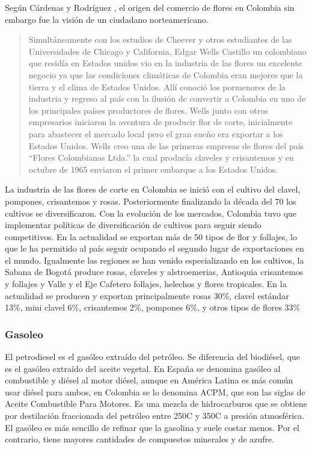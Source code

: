 Según Cárdenas y Rodríguez \cite{cardenasRodriguez}, el origen del comercio de flores en Colombia sin embargo fue la visión de un ciudadano norteamericano. 

\begin{quote}
Simultáneamente con los estudios de Cheever y otros estudiantes de las Universidades de Chicago y California, Edgar Wells Castillo un colombiano que residía en Estados unidos vio en la industria de las flores un excelente negocio ya que las condiciones climáticas de Colombia eran mejores que la tierra  y  el  clima de Estados Unidos. Allí conoció los pormenores de la industria y regreso al país con la ilusión de convertir a Colombia en uno de los principales países productores de flores. Wells junto con otros empresarios iniciaron la aventura de producir flor de corte, inicialmente para abastecer el mercado local pero el gran sueño era exportar a los Estados Unidos. Wells creo una de las primeras empresas de flores del país “Flores  Colombianas  Ltda.” la cual producía claveles y crisantemos y en octubre de 1965 enviaron el primer embarque a los Estados Unidos.
\end{quote}

La industria de las flores de corte en Colombia se inició con el cultivo del clavel, pompones, crisantemos y rosas. Posteriormente finalizando la década del  70 los cultivos se diversificaron. Con la evolución de los mercados, Colombia  tuvo que implementar políticas de diversificación de cultivos para seguir siendo  competitivos.  En  la  actualidad  se  exportan  más  de  50  tipos  de  flor  y  follajes,  lo  que  le  ha  permitido  al  país  seguir  ocupando el segundo lugar de exportaciones en el mundo. Igualmente  las  regiones  se  han  venido  especializando  en  los  cultivos, la Sabana de Bogotá produce rosas, claveles y alstroemerias, Antioquia crisantemos y follajes y Valle y el Eje Cafetero  follajes, helechos y flores tropicales. En la actualidad se producen y  exportan  principalmente rosas 30\%, clavel estándar 13\%, mini clavel 6\%, crisantemos 2\%, pompones 6\%, y otros tipos de flores 33\% \cite{cardenasRodriguez}

\subsubsection{Gasoleo}
El petrodiesel es el gasóleo extraído del petróleo. Se diferencia del biodiésel, que es el gasóleo extraído del aceite vegetal. En España se denomina gasóleo al combustible y diésel al motor diésel, aunque en América Latina es más común usar diésel para ambos, en Colombia se lo denomina ACPM, que son las siglas de Aceite Combustible Para Motores. Es una mezcla de hidrocarburos que se obtiene por destilación fraccionada del petróleo entre 250C y 350C a presión atmosférica. El gasóleo es más sencillo de refinar que la gasolina y suele costar menos. Por el contrario, tiene mayores cantidades de compuestos minerales y de azufre.


